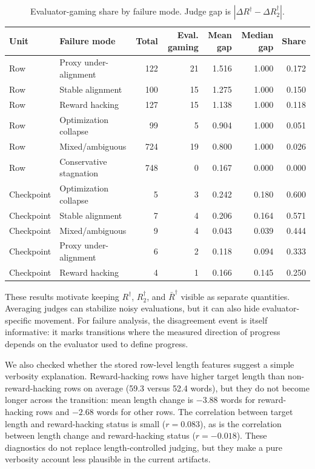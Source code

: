 \documentclass[11pt]{article}
\newcommand{\Rdag}{R^{\dagger}}
\newcommand{\Rtwo}{R^{\dagger}_2}
\newcommand{\Rbar}{\bar R^{\dagger}}
\newcommand{\delt}{\Delta}
\begin{document}
\begin{table}[h]
\centering
\small
\caption{Evaluator-gaming share by failure mode. Judge gap is $|\delt\Rdag-\delt\Rtwo|$.}
\label{tab:appendix-judge-disagreement}
\begin{tabular}{llrrrrr}
\toprule
Unit & Failure mode & Total & Eval. gaming & Mean gap & Median gap & Share \\
\midrule
Row & Proxy under-alignment & 122 & 21 & 1.516 & 1.000 & 0.172 \\
Row & Stable alignment & 100 & 15 & 1.275 & 1.000 & 0.150 \\
Row & Reward hacking & 127 & 15 & 1.138 & 1.000 & 0.118 \\
Row & Optimization collapse & 99 & 5 & 0.904 & 1.000 & 0.051 \\
Row & Mixed/ambiguous & 724 & 19 & 0.800 & 1.000 & 0.026 \\
Row & Conservative stagnation & 748 & 0 & 0.167 & 0.000 & 0.000 \\
\midrule
Checkpoint & Optimization collapse & 5 & 3 & 0.242 & 0.180 & 0.600 \\
Checkpoint & Stable alignment & 7 & 4 & 0.206 & 0.164 & 0.571 \\
Checkpoint & Mixed/ambiguous & 9 & 4 & 0.043 & 0.039 & 0.444 \\
Checkpoint & Proxy under-alignment & 6 & 2 & 0.118 & 0.094 & 0.333 \\
Checkpoint & Reward hacking & 4 & 1 & 0.166 & 0.145 & 0.250 \\
\bottomrule
\end{tabular}
\end{table}

These results motivate keeping $\Rdag$, $\Rtwo$, and $\Rbar$ visible as separate quantities. Averaging judges can stabilize noisy evaluations, but it can also hide evaluator-specific movement. For failure analysis, the disagreement event is itself informative: it marks transitions where the measured direction of progress depends on the evaluator used to define progress.

We also checked whether the stored row-level length features suggest a simple verbosity explanation. Reward-hacking rows have higher target length than non-reward-hacking rows on average (59.3 versus 52.4 words), but they do not become longer across the transition: mean length change is $-3.88$ words for reward-hacking rows and $-2.68$ words for other rows. The correlation between target length and reward-hacking status is small ($r=0.083$), as is the correlation between length change and reward-hacking status ($r=-0.018$). These diagnostics do not replace length-controlled judging, but they make a pure verbosity account less plausible in the current artifacts.
\end{document}
